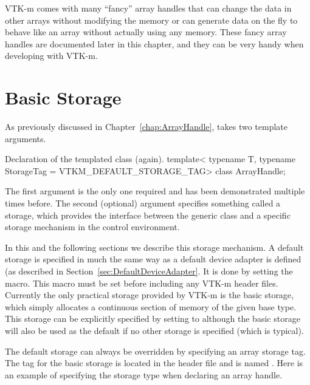 \begin{didyouknow}
  VTK-m comes with many ``fancy'' array handles that can change the data in
  other arrays without modifying the memory or can generate data on the fly
  to behave like an array without actually using any memory. These fancy
  array handles are documented later in this chapter, and they can be very
  handy when developing with VTK-m.
\end{didyouknow}


\section{Basic Storage}


As previously discussed in Chapter~\ref{chap:ArrayHandle},
 takes two template arguments.
\begin{vtkmexample}{Declaration of the \protect{} templated class (again).}
template<
    typename T,
    typename StorageTag = VTKM_DEFAULT_STORAGE_TAG>
class ArrayHandle;
\end{vtkmexample}
The first argument is the only one required and has been demonstrated
multiple times before. The second (optional) argument specifies something
called a storage, which provides the interface between the generic
 class and a specific storage mechanism in the
control environment.

In this and the following sections we describe this storage mechanism. A
default storage is specified in much the same way as a default device
adapter is defined (as described in Section~\ref{sec:DefaultDeviceAdapter}.
It is done by setting the  macro. This macro must
be set before including any VTK-m header files. Currently the only
practical storage provided by VTK-m is the basic storage, which simply
allocates a continuous section of memory of the given base type. This
storage can be explicitly specified by setting  to
 although the basic storage will also be
used as the default if no other storage is specified (which is typical).

The default storage can always be overridden by specifying an array
storage tag. The tag for the basic storage is located in the
 header file and is named
. Here is an example of specifying
the storage type when declaring an array handle.

